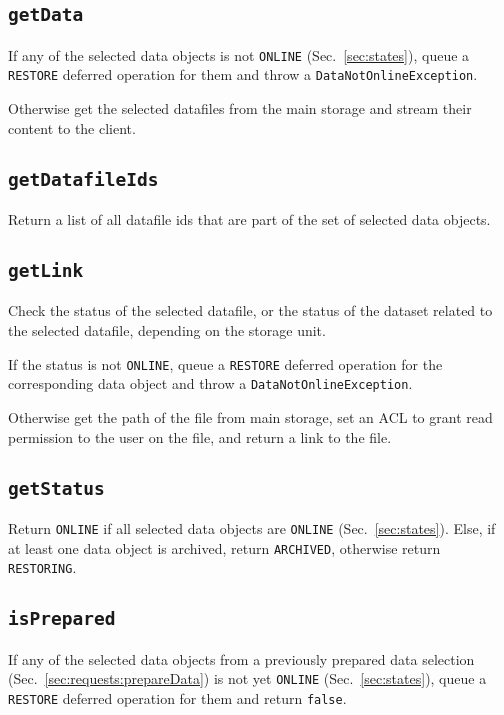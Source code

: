 \documentclass[paper=a4]{scrartcl}
\begin{document}
\subsection{\texttt{getData}}
\label{sec:requests:getdata}

If any of the selected data objects is not \texttt{ONLINE}
(Sec.~\ref{sec:states}), queue a \texttt{RESTORE} deferred operation
for them and throw a \texttt{DataNotOnlineException}.

Otherwise get the selected datafiles from the main storage and
stream their content to the client.

\subsection{\texttt{getDatafileIds}}

Return a list of all datafile ids that are part of the set of
selected data objects.

\subsection{\texttt{getLink}}
\label{sec:requests:getlink}

Check the status of the selected datafile, or the status of the
dataset related to the selected datafile, depending on the
storage unit.

If the status is not \texttt{ONLINE}, queue a \texttt{RESTORE}
deferred operation for the corresponding data object and throw a
\texttt{DataNotOnlineException}.

Otherwise get the path of the file from main storage, set an ACL to
grant read permission to the user on the file, and return a link to
the file.

\subsection{\texttt{getStatus}}

Return \texttt{ONLINE} if all selected data objects are
\texttt{ONLINE} (Sec.~\ref{sec:states}).  Else, if at least one data
object is archived, return \texttt{ARCHIVED}, otherwise return
\texttt{RESTORING}.

\subsection{\texttt{isPrepared}}

If any of the selected data objects from a previously prepared
data selection (Sec.~\ref{sec:requests:prepareData}) is not yet
\texttt{ONLINE} (Sec.~\ref{sec:states}), queue a \texttt{RESTORE}
deferred operation for them and return \texttt{false}.
\end{document}
